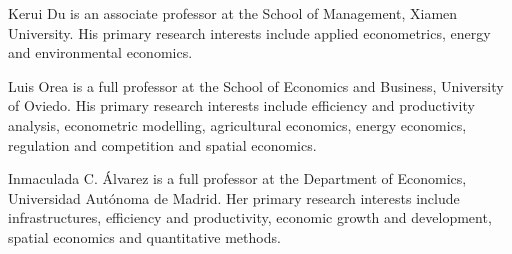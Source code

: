 %
%








\begin{aboutauthors}

Kerui Du is an associate professor at the School of Management, Xiamen University. His primary research interests include applied econometrics, energy and environmental economics.

Luis Orea is a full professor at the School of Economics and Business, University of Oviedo. His primary research interests include efficiency and productivity analysis, econometric modelling, agricultural economics, energy economics, regulation and competition and spatial economics.

Inmaculada C. Álvarez is a full professor at the Department of Economics, Universidad Autónoma de Madrid. Her primary research interests include infrastructures, efficiency and productivity, economic growth and development, spatial economics and quantitative methods.

	

	
\end{aboutauthors}


\endinput
